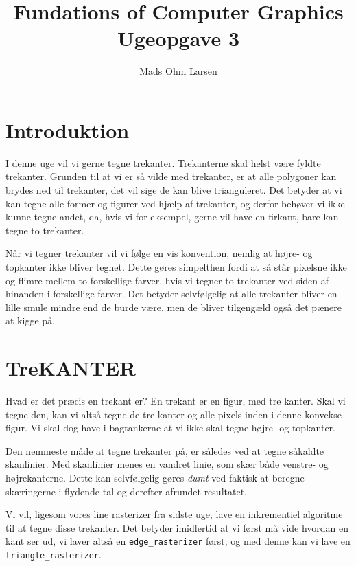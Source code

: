\documentclass[a4paper, 10pt]{article}
\title{Fundations of Computer Graphics\\ Ugeopgave 3}
\author{Mads Ohm Larsen}
\begin{document}
\lstset{language=C, basicstyle=\footnotesize, numbers=left, stepnumber=2, numberstyle=\tiny, frameround=tttt, frame=tlBR, captionpos=b}
\maketitle

\section{Introduktion}
I denne uge vil vi gerne tegne trekanter.
Trekanterne skal helst være fyldte trekanter.
Grunden til at vi er så vilde med trekanter, er at alle polygoner kan brydes ned til trekanter, det vil sige de kan blive trianguleret.
Det betyder at vi kan tegne alle former og figurer ved hjælp af trekanter, og derfor behøver vi ikke kunne tegne andet, da, hvis vi for eksempel, gerne vil have en firkant, bare kan tegne to trekanter.

Når vi tegner trekanter vil vi følge en vis konvention, nemlig at højre- og topkanter ikke bliver tegnet.
Dette gøres simpelthen fordi at så står pixelsne ikke og flimre mellem to forskellige farver, hvis vi tegner to trekanter ved siden af hinanden i forskellige farver.
Det betyder selvfølgelig at alle trekanter bliver en lille smule mindre end de burde være, men de bliver tilgengæld også det pænere at kigge på.


\section{TreKANTER}
Hvad er det præcis en trekant er?
En trekant er en figur, med tre kanter.
Skal vi tegne den, kan vi altså tegne de tre kanter og alle pixels inden i denne konvekse figur.
Vi skal dog have i bagtankerne at vi ikke skal tegne højre- og topkanter.

Den nemmeste måde at tegne trekanter på, er således ved at tegne såkaldte skanlinier.
Med skanlinier menes en vandret linie, som skær både venstre- og højrekanterne.
Dette kan selvfølgelig gøres \textit{dumt} ved faktisk at beregne skæringerne i flydende tal og derefter afrundet resultatet.

Vi vil, ligesom vores line rasterizer fra sidste uge, lave en inkrementiel algoritme til at tegne disse trekanter.
Det betyder imidlertid at vi først må vide hvordan en kant ser ud, vi laver altså en \texttt{edge\_rasterizer} først, og med denne kan vi lave en \texttt{triangle\_rasterizer}.
\end{document}
